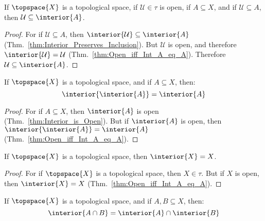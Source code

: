 \documentclass{article}                                                        %
\begin{document}
        \begin{theorem}
            \label{thm:Open_Subset_of_A_is_Subset_of_Interior}%
            If $\topspace{X}$ is a topological space, if $\mathcal{U}\in\tau$
            is open, if $A\subseteq{X}$, and if $\mathcal{U}\subseteq{A}$,
            then $\mathcal{U}\subseteq\interior{A}$.
        \end{theorem}
        \begin{proof}
            For if $\mathcal{U}\subseteq{A}$, then
            $\interior{\mathcal{U}}\subseteq\interior{A}$
            (Thm.~\ref{thm:Interior_Preserves_Inclusion}). But $\mathcal{U}$ is
            open, and therefore $\interior{\mathcal{U}}=\mathcal{U}$
            (Thm.~\ref{thm:Open_iff_Int_A_eq_A}). Therefore
            $\mathcal{U}\subseteq\interior{A}$.
        \end{proof}
        \begin{theorem}
            \label{thm:Idempotence_of_Interior}
            If $\topspace{X}$ is a topological space, and if $A\subseteq{X}$,
            then:
            \begin{equation}
                \interior{\interior{A}}=\interior{A}
            \end{equation}
        \end{theorem}
        \begin{proof}
            For if $A\subseteq{X}$, then $\interior{A}$ is open
            (Thm.~\ref{thm:Interior_is_Open}). But if $\interior{A}$ is open,
            then $\interior{\interior{A}}=\interior{A}$
            (Thm.~\ref{thm:Open_iff_Int_A_eq_A}).
        \end{proof}
        \begin{theorem}
            \label{thm:Interior_of_Whole_Space}%
            If $\topspace{X}$ is a topological space, then $\interior{X}=X$.
        \end{theorem}
        \begin{proof}
            For if $\topspace{X}$ is a topological space, then $X\in\tau$. But
            if $X$ is open, then $\interior{X}=X$
            (Thm.~\ref{thm:Open_iff_Int_A_eq_A}).
        \end{proof}
        \begin{theorem}
            \label{thm:Interior_Preserves_Intersection}%
            If $\topspace{X}$ is a topological space, and if $A,B\subseteq{X}$,
            then:
            \begin{equation}
                \interior{A\cap{B}}=\interior{A}\cap\interior{B}
            \end{equation}
        \end{theorem}
\end{document}

